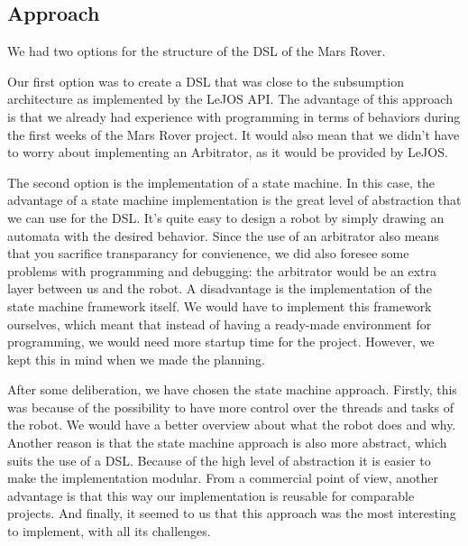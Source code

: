 \documentclass[11pt,a4paper]{article}
\begin{document}
\subsection{Approach}
We had two options for the structure of the DSL of the Mars Rover. 

Our first option was to create a DSL that was close to the subsumption architecture as implemented by the LeJOS API. The advantage of this approach is that we already had experience with programming in terms of behaviors during the first weeks of the Mars Rover project. It would also mean that we didn't have to worry about implementing an Arbitrator, as it would be provided by LeJOS.

The second option is the implementation of a state machine.
In this case, the advantage of a state machine implementation is the great level of abstraction that we can use for the DSL. 
It's quite easy to design a robot by simply drawing an automata with the desired behavior.
Since the use of an arbitrator also means that you sacrifice transparancy for convienence, we did also foresee some problems with programming and debugging: the arbitrator would be an extra layer between us and the robot. 
A disadvantage is the implementation of the state machine framework itself. 
We would have to implement this framework ourselves, which meant that instead of having a ready-made environment for programming, we would need more startup time for the project. However, we kept this in mind when we made the planning.

After some deliberation, we have chosen the state machine approach.
Firstly, this was because of the possibility to have more control over the threads and tasks of the robot. 
We would have a better overview about what the robot does and why. 
Another reason is that the state machine approach is also more abstract, which suits the use of a DSL. 
Because of the high level of abstraction it is easier to make the implementation modular. 
From a commercial point of view, another advantage is that this way our implementation is reusable for comparable projects. 
And finally, it seemed to us that this approach was the most interesting to implement, with all its challenges.
\end{document}

